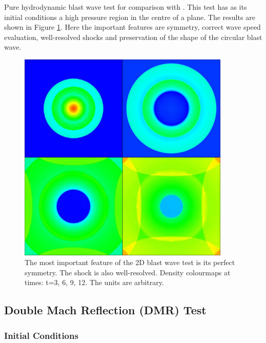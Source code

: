 Pure hydrodynamic blast wave test for comparison with \citet[][hereafter LDZ]{2000ApJ...530..508L}.
This test has as its initial conditions a high pressure region in the centre of a plane.
The results are shown in Figure \ref{fig:3-hdblastwave}.
Here the important features are symmetry, correct wave speed evaluation, well-resolved shocks and preservation of the shape of the circular blast wave.

\begin{figure}[t]
\centering
\includegraphics[width=0.9\textwidth]{hdblastwave}
\caption{
The most important feature of the 2D blast wave test is its perfect symmetry. The shock is also well-resolved.
Density colourmaps at times: t=3, 6, 9, 12.
The units are arbitrary.
}
\label{fig:3-hdblastwave} %
\end{figure}

\subsection{Double Mach Reflection (DMR) Test}


\subsubsection{Initial Conditions}


